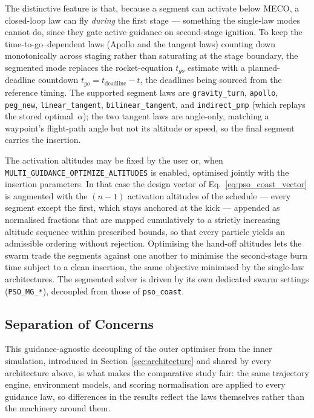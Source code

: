 The distinctive feature is that, because a segment can activate below MECO, a
closed-loop law can fly \emph{during} the first stage --- something the single-law
modes cannot do, since they gate active guidance on second-stage ignition. To keep
the time-to-go--dependent laws (Apollo and the tangent laws) counting down
monotonically across staging rather than saturating at the stage boundary, the
segmented mode replaces the rocket-equation $t_{go}$ estimate with a
planned-deadline countdown $t_{go}=t_{\mathrm{deadline}}-t$, the deadlines being
sourced from the reference timing. The supported segment laws are
\texttt{gravity\_turn}, \texttt{apollo}, \texttt{peg\_new}, \texttt{linear\_tangent},
\texttt{bilinear\_tangent}, and \texttt{indirect\_pmp} (which replays the stored
optimal~$\alpha$); the two tangent laws are angle-only, matching a waypoint's
flight-path angle but not its altitude or speed, so the final segment carries the
insertion.

The activation altitudes may be fixed by the user or, when
\texttt{MULTI\_GUIDANCE\_OPTIMIZE\_ALTITUDES} is enabled, optimised jointly with the
insertion parameters. In that case the design vector of
Eq.~\eqref{eq:pso_coast_vector} is augmented with the $(n-1)$ activation altitudes
of the schedule --- every segment except the first, which stays anchored at the kick
--- appended as normalised fractions that are mapped cumulatively to a strictly
increasing altitude sequence within prescribed bounds, so that every particle yields
an admissible ordering without rejection. Optimising the hand-off altitudes lets the
swarm trade the segments against one another to minimise the second-stage burn time
subject to a clean insertion, the same objective minimised by the single-law
architectures. The segmented solver is driven by its own dedicated swarm settings
(\texttt{PSO\_MG\_*}), decoupled from those of \texttt{pso\_coast}.

\subsection{Separation of Concerns}
\label{ssec:separation}

This guidance-agnostic decoupling of the outer optimiser from the inner
simulation, introduced in Section~\ref{sec:architecture} and shared by every
architecture above, is what makes the comparative study fair: the same trajectory
engine, environment models, and scoring normalisation are applied to every guidance
law, so differences in the results reflect the laws themselves rather than the
machinery around them.

